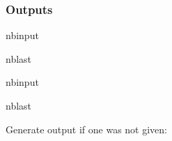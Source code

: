 \documentclass[letterpaper,10pt,english]{sphinxmanual}
\begin{document}
\subsubsection{Outputs}
\label{\detokenize{examples/02_SISO_Event:Outputs}}
\begin{sphinxuseclass}{nbinput}
\begin{sphinxuseclass}{nblast}
{
\begin{sphinxVerbatim}[commandchars=\\\{\}]
\llap{\color{nbsphinxin}[ ]:\,\hspace{\fboxrule}\hspace{\fboxsep}}  
\end{sphinxVerbatim}
}

\end{sphinxuseclass}
\end{sphinxuseclass}
\begin{sphinxuseclass}{nbinput}
\begin{sphinxuseclass}{nblast}
{
\begin{sphinxVerbatim}[commandchars=\\\{\}]
\llap{\color{nbsphinxin}[ ]:\,\hspace{\fboxrule}\hspace{\fboxsep}}
         
           
      
\end{sphinxVerbatim}
}

\end{sphinxuseclass}
\end{sphinxuseclass}
\sphinxAtStartPar
Generate output if one was not given:
\end{document}
